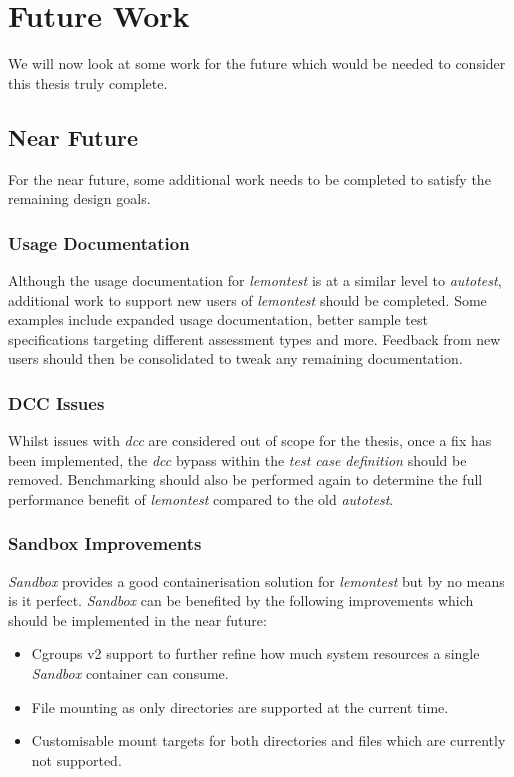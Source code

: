 \documentclass[hidelinks]{report}
\newcommand{\unchapter}[2]{
    \setcounter{chapter}{#1}
    \setcounter{section}{0}
    \chapter*{#2}
    \addcontentsline{toc}{chapter}{#2}
}
\begin{document}
\unchapter{7}{Future Work}
We will now look at some work for the future which would be needed to consider this thesis truly complete.

\section{Near Future}
For the near future, some additional work needs to be completed to satisfy the remaining design goals.
\subsection{Usage Documentation}
Although the usage documentation for \textit{lemontest} is at a similar level to \textit{autotest}, additional work to support new users of \textit{lemontest} should be completed. Some examples include expanded usage documentation, better sample test specifications targeting different assessment types and more. Feedback from new users should then be consolidated to tweak any remaining documentation.

\subsection{DCC Issues}
Whilst issues with \textit{dcc} are considered out of scope for the thesis, once a fix has been implemented, the \textit{dcc} bypass within the \textit{test case definition} should be removed. Benchmarking should also be performed again to determine the full performance benefit of \textit{lemontest} compared to the old \textit{autotest}. 

\subsection{Sandbox Improvements}
\textit{Sandbox} provides a good containerisation solution for \textit{lemontest} but by no means is it perfect. \textit{Sandbox} can be benefited by the following improvements which should be implemented in the near future:
\begin{itemize}
	\item Cgroups v2 support to further refine how much system resources a single \textit{Sandbox} container can consume.
	\item File mounting as only directories are supported at the current time.
	\item Customisable mount targets for both directories and files which are currently not supported.
\end{itemize}
\end{document}
